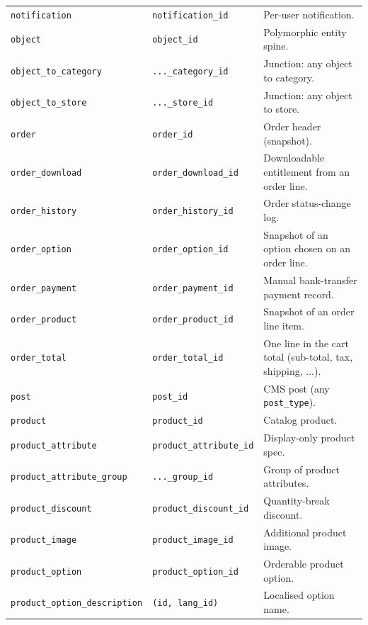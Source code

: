 \documentclass[11pt,a4paper]{article}
\begin{document}
\begin{longtable}{>{\raggedright\arraybackslash}p{4.7cm}>{\raggedright\arraybackslash}p{3.4cm}>{\raggedright\arraybackslash}p{6.3cm}}
\texttt{notification}            & \texttt{notification\_id}   & Per-user notification. \\
\texttt{object}                  & \texttt{object\_id}         & Polymorphic entity spine. \\
\texttt{object\_to\_category}    & \texttt{...\_category\_id} & Junction: any object to category. \\
\texttt{object\_to\_store}       & \texttt{...\_store\_id} & Junction: any object to store. \\
\texttt{order}                   & \texttt{order\_id}          & Order header (snapshot). \\
\texttt{order\_download}         & \texttt{order\_download\_id} & Downloadable entitlement from an order line. \\
\texttt{order\_history}          & \texttt{order\_history\_id} & Order status-change log. \\
\texttt{order\_option}           & \texttt{order\_option\_id}  & Snapshot of an option chosen on an order line. \\
\texttt{order\_payment}          & \texttt{order\_payment\_id} & Manual bank-transfer payment record. \\
\texttt{order\_product}          & \texttt{order\_product\_id} & Snapshot of an order line item. \\
\texttt{order\_total}            & \texttt{order\_total\_id}   & One line in the cart total (sub-total, tax, shipping, ...). \\
\texttt{post}                    & \texttt{post\_id}           & CMS post (any \texttt{post\_type}). \\
\texttt{product}                 & \texttt{product\_id}        & Catalog product. \\
\texttt{product\_attribute}      & \texttt{product\_attribute\_id} & Display-only product spec. \\
\texttt{product\_attribute\_group} & \texttt{...\_group\_id} & Group of product attributes. \\
\texttt{product\_discount}       & \texttt{product\_discount\_id} & Quantity-break discount. \\
\texttt{product\_image}          & \texttt{product\_image\_id} & Additional product image. \\
\texttt{product\_option}         & \texttt{product\_option\_id} & Orderable product option. \\
\texttt{product\_option\_description} & \texttt{(id, lang\_id)} & Localised option name. \\

\end{longtable}
\end{document}
